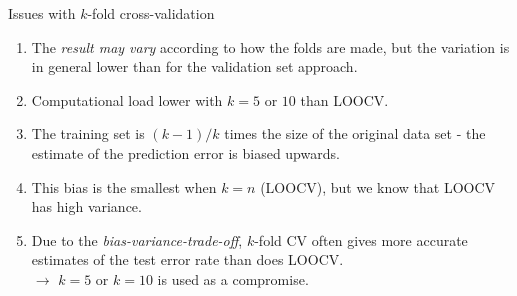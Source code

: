 \documentclass[
  10pt,
  ignorenonframetext,
]{beamer}
\providecommand{\tightlist}{%
  \setlength{\itemsep}{0pt}\setlength{\parskip}{0pt}}
\begin{document}
\begin{frame}
\begin{block}{Issues with \(k\)-fold cross-validation}
\protect\hypertarget{issues-with-k-fold-cross-validation}{}
\(~\)

\begin{enumerate}
\tightlist
\item
  The \emph{result may vary} according to how the folds are made, but
  the variation is in general lower than for the validation set
  approach.
\end{enumerate}

\vspace{2mm}

\begin{enumerate}
\setcounter{enumi}{1}
\tightlist
\item
  Computational load lower with \(k=5\) or \(10\) than LOOCV.
\end{enumerate}

\vspace{2mm}

\begin{enumerate}
\setcounter{enumi}{2}
\tightlist
\item
  The training set is \((k-1)/k\) times the size of the original data
  set - the estimate of the prediction error is biased upwards.
\end{enumerate}

\vspace{2mm}

\begin{enumerate}
\setcounter{enumi}{3}
\tightlist
\item
  This bias is the smallest when \(k=n\) (LOOCV), but we know that LOOCV
  has high variance.
\end{enumerate}

\vspace{2mm}

\begin{enumerate}
\setcounter{enumi}{4}
\tightlist
\item
  Due to the \emph{bias-variance-trade-off}, \(k\)-fold CV often gives
  more accurate estimates of the test error rate than does LOOCV.\\
  \(\rightarrow\) \(k=5\) or \(k=10\) is used as a compromise.
\end{enumerate}
\end{block}
\end{frame}
\end{document}
